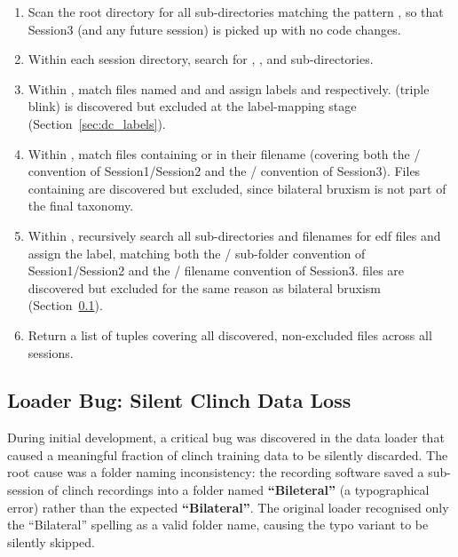 \begin{enumerate}[leftmargin=*]
    \item Scan the  root directory for all
    sub-directories matching the pattern , so
    that Session3 (and any future session) is picked up with no
    code changes.
    \item Within each session directory, search for
    , , and 
    sub-directories.
    \item Within , match files named
     and  and assign labels
     and  respectively.
     (triple blink) is discovered but excluded
    at the label-mapping stage (Section~\ref{sec:dc_labels}).
    \item Within , match files containing
     or  in their filename (covering both
    the / convention of Session1/Session2
    and the / convention of
    Session3). Files containing  are discovered but
    excluded, since bilateral bruxism is not part of the final
    taxonomy.
    \item Within , recursively search all
    sub-directories and filenames for \acrshort{edf} files and
    assign the  label, matching both the
    / sub-folder convention of
    Session1/Session2 and the /
    filename convention of Session3.  files
    are discovered but excluded for the same reason as bilateral
    bruxism (Section~\ref{sec:dc_bug}).
    \item Return a list of  tuples
    covering all discovered, non-excluded files across all
    sessions.
\end{enumerate}

\subsection{Loader Bug: Silent Clinch Data Loss}
\label{sec:dc_bug}

During initial development, a critical bug was discovered in
the data loader that caused a meaningful fraction of clinch
training data to be silently discarded. The root cause was a
folder naming inconsistency: the recording software saved a
sub-session of clinch recordings into a folder named
\textbf{``Bileteral''} (a typographical error) rather than the
expected \textbf{``Bilateral''}. The original loader recognised
only the ``Bilateral'' spelling as a valid folder name, causing
the typo variant to be silently skipped.

